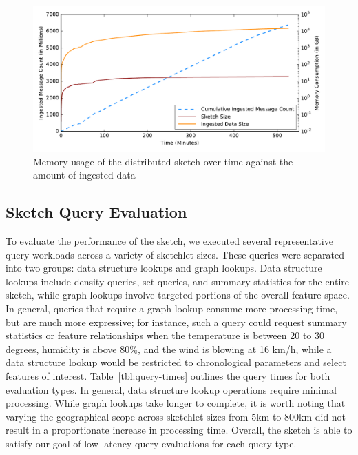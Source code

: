 \begin{figure}
    \centerline{\includegraphics[width=\linewidth]{figures/ing-and-mem-usage.pdf}}
    \caption{Memory usage of the distributed sketch over time against the amount of ingested data}
    \label{fig:stability-backlog}
\end{figure}


\subsection{Sketch Query Evaluation}
To evaluate the performance of the sketch, we executed several representative query workloads across a variety of sketchlet sizes. These queries were separated into two groups: data structure lookups and graph lookups. Data structure lookups include density queries, set queries, and summary statistics for the entire sketch, while graph lookups involve targeted portions of the overall feature space. In general, queries that require a graph lookup consume more processing time, but are much more expressive; for instance, such a query could request summary statistics or feature relationships when the temperature is between 20 to 30 degrees, humidity is above 80\%, and the wind is blowing at 16 km/h, while a data structure lookup would be restricted to chronological parameters and select features of interest. Table~\ref{tbl:query-times} outlines the query times for both evaluation types. In general, data structure lookup operations require minimal processing. While graph lookups take longer to complete, it is worth noting that varying the geographical scope across sketchlet sizes from 5km to 800km did not result in a proportionate increase in processing time. Overall, the sketch is able to satisfy our goal of low-latency query evaluations for each query type. \\ \vspace{2.5em}

